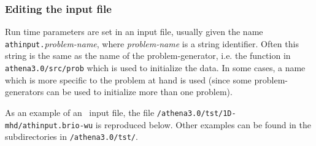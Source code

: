 \subsubsection{Editing the input file}

Run time parameters are set in an input file, usually given the name
{\tt athinput.}{\it problem-name}, where {\it problem-name} is a
string identifier.  Often this string is the same as the name of the
problem-generator, i.e. the function in {\tt athena3.0/src/prob} which
is used to initialize the data.  In some cases, a name which is more
specific to the problem at hand is used (since some problem-generators
can be used to initialize more than one problem).

As an example of an \ath\ input file, the file 
{\tt /athena3.0/tst/1D-mhd/athinput.brio-wu} is reproduced below.
Other examples can be found in the subdirectories in {\tt /athena3.0/tst/}.

